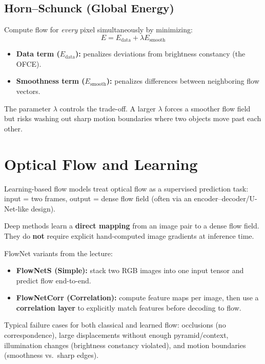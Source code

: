 \documentclass[11pt, oneside]{book}
\begin{document}
\subsection{Horn--Schunck (Global Energy)}

\begin{thmbox}[title={Horn--Schunck Global Energy}]
Compute flow for \emph{every} pixel simultaneously by minimizing:
\[
E = E_{\text{data}} + \lambda E_{\text{smooth}}
\]
\begin{itemize}
  \item \textbf{Data term ($E_{\text{data}}$):} penalizes deviations from brightness constancy (the OFCE).
  \item \textbf{Smoothness term ($E_{\text{smooth}}$):} penalizes differences between neighboring flow vectors.
\end{itemize}
\end{thmbox}

The parameter $\lambda$ controls the trade-off. A larger $\lambda$ forces a smoother flow field but risks
washing out sharp motion boundaries where two objects move past each other.

\section{Optical Flow and Learning}

\begin{defbox}[title={Learning-Based Flow}]
Learning-based flow models treat optical flow as a supervised prediction task:
input = two frames, output = dense flow field (often via an encoder--decoder/U-Net-like design).
\end{defbox}

Deep methods learn a \textbf{direct mapping} from an image pair to a dense flow field.
They do \textbf{not} require explicit hand-computed image gradients at inference time.

FlowNet variants from the lecture:
\begin{itemize}
  \item \textbf{FlowNetS (Simple):} stack two RGB images into one input tensor and predict flow end-to-end.
  \item \textbf{FlowNetCorr (Correlation):} compute feature maps per image, then use a \textbf{correlation layer}
        to explicitly match features before decoding to flow.
\end{itemize}

\begin{notebox}[title={Exam Trap}]
Typical failure cases for both classical and learned flow:
occlusions (no correspondence), large displacements without enough pyramid/context,
illumination changes (brightness constancy violated), and motion boundaries (smoothness vs.\ sharp edges).
\end{notebox}
\end{document}
